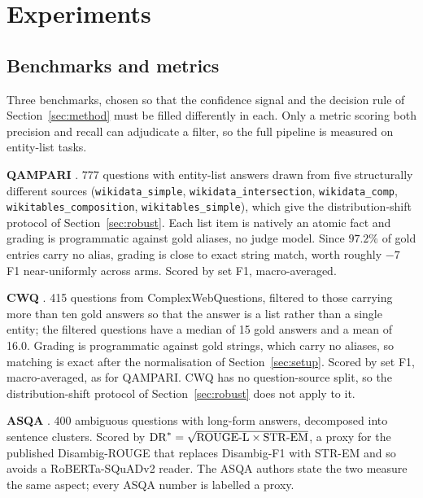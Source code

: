 \documentclass[11pt]{article}
\begin{document}
\section{Experiments}
\label{sec:experiments}

\subsection{Benchmarks and metrics}
\label{sec:metrics}

Three benchmarks, chosen so that the confidence signal and the decision rule of Section~\ref{sec:method} must be filled differently in each. Only a metric scoring both precision and recall can adjudicate a filter, so the full pipeline is measured on entity-list tasks.

\textbf{QAMPARI} \citep{amouyal2022qampari}. 777 questions with entity-list answers drawn from five structurally different sources (\texttt{wikidata\_simple}, \texttt{wikidata\_intersection}, \texttt{wikidata\_comp}, \texttt{wikitables\_composition}, \texttt{wikitables\_simple}), which give the distribution-shift protocol of Section~\ref{sec:robust}.
Each list item is natively an atomic fact and grading is programmatic against gold aliases, no judge model. Since $97.2\%$ of gold entries carry no alias, grading is close to exact string match, worth roughly $-7$ F1 near-uniformly across arms. Scored by set F1, macro-averaged.

\textbf{CWQ} \citep{talmor2018web}. 415 questions from ComplexWebQuestions, filtered to those carrying more than ten gold answers so that the answer is a list rather than a single entity; the filtered questions have a median of 15 gold answers and a mean of 16.0. Grading is programmatic against gold strings, which carry no aliases, so matching is exact after the normalisation of Section~\ref{sec:setup}. Scored by set F1, macro-averaged, as for QAMPARI. CWQ has no question-source split, so the distribution-shift protocol of Section~\ref{sec:robust} does not apply to it.

\textbf{ASQA} \citep{stelmakh2022asqa}. 400 ambiguous questions with long-form answers, decomposed into sentence clusters. Scored by $\mathrm{DR}^* = \sqrt{\mathrm{ROUGE\text-L} \times \mathrm{STR\text-EM}}$, a proxy for the published Disambig-ROUGE that replaces Disambig-F1 with STR-EM and so avoids a RoBERTa-SQuADv2 reader. The ASQA authors state the two measure the same aspect; every ASQA number is labelled a proxy.
\end{document}
